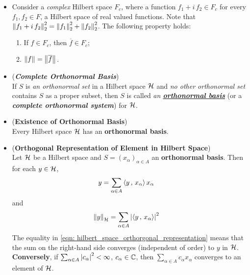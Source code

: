 \documentclass[11pt]{article}
\begin{document}
\begin{itemize}
\item \begin{remark} 

Consider a \emph{complex} Hilbert space $F_{c}$, where a function $f_{1} + i\,f_{2} \in F_{c}$  for every $f_{1}, f_{2}\in F$, a Hilbert space of real valued functions.  
Note that $\left\|f_{1} + i\,f_{2}\right\|_{2}^{2} = \left\|f_{1}\right\|_{2}^{2} + \left\|f_{2}\right\|_{2}^{2}$. The following property holds:
\begin{enumerate}
\item If $f\in F_{c}$, then $\overline{f}\in F_{c}$; 
\item $\left\|f\right\|_{} = \left\|\overline{f}\right\|_{}$.
\end{enumerate}
\end{remark}

\item \begin{definition} (\emph{\textbf{Complete Orthonormal Basis}})\\
If $S$ is \emph{an orthonormal set} in a Hilbert space ${\mathcal H}$ and \emph{no other orthonormal set} contains $S$ as a proper subset, then $S$ is called \emph{an \underline{\textbf{orthonormal basis}}} (or a \emph{\textbf{complete orthonormal system}}) for ${\mathcal H}$.
\end{definition}

\item \begin{theorem} (\textbf{Existence of Orthonormal Basis})\\
Every Hilbert space ${\mathcal H}$ has an \textbf{orthonormal basis}.
\end{theorem}

\item \begin{proposition} (\textbf{Orthogonal Representation of Element in Hilbert Space})\\
Let ${\mathcal H}$ be a Hilbert space and $S = (x_{\alpha})_{\alpha \in A}$ an \textbf{orthonormal basis}. Then for each $y \in {\mathcal H}$,
\begin{align}
y &= \sum_{\alpha \in A}\left\langle y\,,\, x_{\alpha} \right\rangle x_{\alpha} \label{eqn: hilbert_space_orthorgonal_representation}
\end{align}
and
\begin{align}
\left\|y\right\|_{{\mathcal H}} &= \sum_{\alpha \in A}\left\lvert \left\langle y\,,\, x_{\alpha} \right\rangle \right\rvert^2 \label{eqn: hilbert_space_norm_representation}
\end{align}
The equality in \eqref{eqn: hilbert_space_orthorgonal_representation} means that the sum on the right-hand side converges (independent of order) to $y$ in ${\mathcal H}$. \textbf{Conversely}, if $\sum_{\alpha \in A}\left\lvert c_{\alpha} \right\rvert^2 < \infty$,  $c_{\alpha} \in {\mathbb C}$, then
$\sum_{\alpha \in A}c_{\alpha} x_{\alpha}$ converges to an element of ${\mathcal H}$.
\end{proposition}


\end{itemize}
\end{document}
